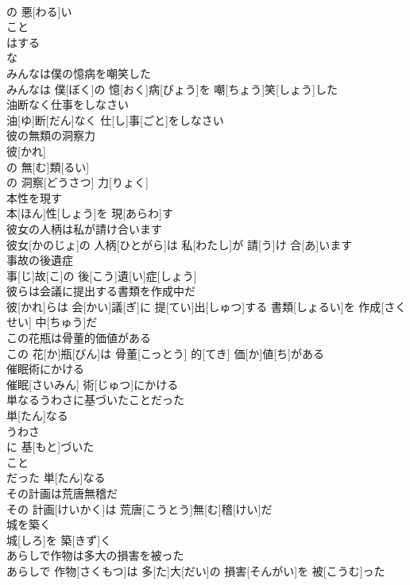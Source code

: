 \documentclass[8pt]{extreport}
\begin{document}
\begin{CJK}{UTF8}{min}
\\	の 悪[わる]い 
\\	こと 
\\	はする 
\\	な
\\	みんなは僕の憶病を嘲笑した	
\\	みんなは 僕[ぼく]の 憶[おく]病[びょう]を 嘲[ちょう]笑[しょう]した
\\	油断なく仕事をしなさい	
\\	油[ゆ]断[だん]なく 仕[し]事[ごと]をしなさい
\\	彼の無類の洞察力	
\\	彼[かれ]
\\	の 無[む]類[るい]
\\	の 洞察[どうさつ] 力[りょく]
\\	本性を現す	
\\	本[ほん]性[しょう]を 現[あらわ]す
\\	彼女の人柄は私が請け合います	
\\	彼女[かのじょ]の 人柄[ひとがら]は 私[わたし]が 請[う]け 合[あ]います
\\	事故の後遺症	
\\	事[じ]故[こ]の 後[こう]遺[い]症[しょう]
\\	彼らは会議に提出する書類を作成中だ	
\\	彼[かれ]らは 会[かい]議[ぎ]に 提[てい]出[しゅつ]する 書類[しょるい]を 作成[さくせい] 中[ちゅう]だ
\\	この花瓶は骨董的価値がある	
\\	この 花[か]瓶[びん]は 骨董[こっとう] 的[てき] 価[か]値[ち]がある
\\	催眠術にかける	
\\	催眠[さいみん] 術[じゅつ]にかける
\\	単なるうわさに基づいたことだった	
\\	単[たん]なる 
\\	うわさ 
\\	に 基[もと]づいた 
\\	こと 
\\	だった 単[たん]なる 
\\	その計画は荒唐無稽だ	
\\	その 計画[けいかく]は 荒唐[こうとう]無[む]稽[けい]だ
\\	城を築く	
\\	城[しろ]を 築[きず]く
\\	あらしで作物は多大の損害を被った	
\\	あらしで 作物[さくもつ]は 多[た]大[だい]の 損害[そんがい]を 被[こうむ]った

\end{CJK}
\end{document}
